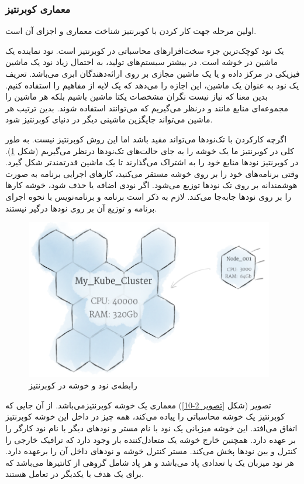 \newpage

\subsubsection{معماری کوبرنتیز}
اولین مرحله جهت کار کردن با کوبرنتیز شناخت معماری و اجزای آن است.

یک نود کوچک‌ترین جزء سخت‌افزارهای محاسباتی در کوبرنتیز است. نود نماینده یک ماشین در خوشه است. در بیشتر سیستم‌های تولید، به احتمال زیاد نود یک ماشین فیزیکی در مرکز داده و یا یک ماشین مجازی بر روی ارائه‌دهندگان ابری می‌باشد. تعریف یک نود به عنوان یک ماشین، ‌این اجازه را می‌دهد که یک لایه از مفاهیم را استفاده  کنیم. بدین معنا که نیاز نیست نگران مشخصات یکتا ماشین باشیم بلکه هر ماشین را مجموعه‌ای منابع مانند  و  درنظر می‌گیریم که می‌توانند استفاده شوند. بدین ترتیب هر ماشین می‌تواند جایگزین ماشینی دیگر در دنیای کوبرنتیز شود.

اگرچه کارکردن با تک‌نودها می‌تواند مفید باشد اما این روش کوبرنتیز نیست. به طور کلی در کوبرنتیز ما یک خوشه را به جای حالت‌های تک‌نودها درنظر می‌گیریم (شکل \ref{تصویر 2-9}). در کوبرنتیز نودها منابع خود را به اشتراک می‌گذارند تا یک ماشین قدرتمند‌تر شکل گیرد. وقتی برنامه‌های خود را بر روی خوشه مستقر می‌کنید، کارهای اجرایی برنامه به صورت هوشمندانه بر روی تک نودها توزیع می‌شود. اگر نودی اضافه یا حذف شود، خوشه کارها را بر روی نودها  جابه‌جا می‌کند. لازم به ذکر است برنامه و برنامه‌نویس با نحوه اجرای برنامه و توزیع آن بر روی نودها درگیر نیستند.

\begin{figure}[!h]
	\centering
	\includegraphics[height=7cm]{images/cluster-and-node}
	\caption{رابطه‌ی نود و خوشه در کوبرنتیز}
	\label{تصویر 2-9}
\end{figure}

تصویر (شکل \ref{تصویر 2-10}) معماری یک خوشه کوبرنتیزمی‌باشد. از آن جایی که کوبرنتیز یک خوشه محاسباتی را پیاده می‌کند، همه چیز در داخل این خوشه کوبرنتیز اتفاق می‌افتد. این خوشه میزبانی یک نود با نام مستر و نودهای دیگر با نام نود کارگر را بر عهده دارد. همچنین خارج خوشه یک متعادل‌کننده بار وجود دارد که ترافیک خارجی را کنترل و بین نودها پخش می‌کند.  مستر کنترل خوشه و نودهای داخل آن را برعهده دارد. هر نود میزبان یک یا تعدادی پاد می‌باشد و هر پاد شامل گروهی از کانتیرها می‌باشد که برای یک هدف با یکدیگر در تعامل هستند.


